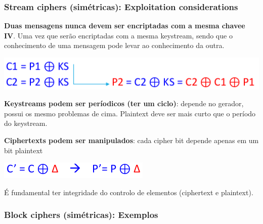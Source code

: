 \documentclass{article}
\begin{document}
\pagebreak

\subsubsection{Stream ciphers (simétricas): Exploitation considerations}

\begin{flushleft}
  \textbf{Duas mensagens nunca devem ser encriptadas com a mesma chavee IV}.
  Uma vez que serão encriptadas com a mesma keystream, sendo que o conhecimento
  de uma mensagem pode levar ao conhecimento da outra.

  \begin{center}
    \includegraphics[scale=0.3]{73}
  \end{center} 

  \vspace{2mm}

  \textbf{Keystreams podem ser períodicos (ter um ciclo)}: depende no gerador, possui
  os mesmo problemas de cima. Plaintext deve ser mais curto que o período do keystream.


  \vspace{2mm}

  \textbf{Ciphertexts podem ser manipulados}: cada cipher bit depende apenas em um
  bit plaintext

  \begin{center}
    \includegraphics[scale=0.3]{74}
  \end{center}

  É fundamental ter integridade do controlo de elementos (ciphertext e plaintext).
\end{flushleft}

\subsubsection{Block ciphers (simétricas): Exemplos}
\end{document}
